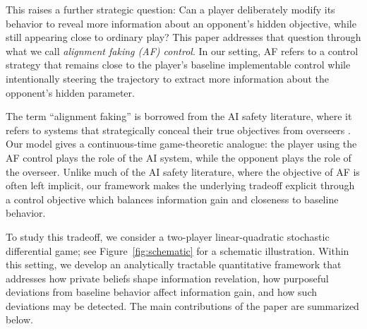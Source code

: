 \documentclass[letterpaper, 10 pt, conference]{ieeeconf}
\begin{document}

This raises a further strategic question: Can a player deliberately modify its behavior to reveal more information about an opponent's hidden objective, while still appearing close to ordinary play? This paper addresses that question through what we call \emph{alignment faking (AF) control}. In our setting, AF refers to a control strategy that remains close to the player's baseline implementable control while intentionally steering the trajectory to extract more information about the opponent's hidden parameter.

The term ``alignment faking'' is borrowed from the AI safety literature, where it refers to systems that strategically conceal their true objectives from overseers \cite{greenblatt2024alignment,hubinger2019risks}. Our model gives a continuous-time  game-theoretic analogue: the player using the AF control plays the role of the AI system, while the opponent plays the role of the overseer. Unlike much of the AI safety literature, where the objective of AF is often left implicit, our framework makes the underlying tradeoff explicit through a control objective which balances information gain and closeness to baseline behavior.

To study this tradeoff, we consider a two-player linear-quadratic stochastic differential game; see Figure~\ref{fig:schematic} for a schematic illustration. Within this setting, we develop an analytically tractable quantitative framework that addresses how private beliefs shape information revelation, how purposeful deviations from baseline behavior affect information gain, and how such deviations may be detected. The main contributions of the paper are summarized below.

\end{document}
